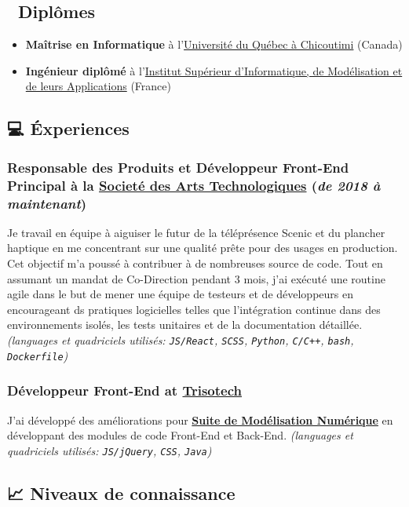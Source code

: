 \documentclass[11pt]{article}
\begin{document}
\subsection{🏫 Diplômes}
\label{sec:org889bc8c}
\begin{itemize}
\item \textbf{Maîtrise en Informatique} à l'\href{https://www.uqac.ca/}{Université du Québec à Chicoutimi} (Canada)
\item \textbf{Ingénieur diplômé} à l'\href{https://www.clermont-auvergne-inp.fr/ecoles/isima/}{Institut Supérieur d’Informatique, de Modélisation et de leurs Applications} (France)
\end{itemize}

\subsection{💻 Éxperiences}
\label{sec:org9f2dbfc}
\subsubsection{\textbf{Responsable des Produits} et \textbf{Développeur Front-End Principal} à la \href{https://sat.qc.ca/}{Societé des Arts Technologiques} (\emph{de 2018 à maintenant})}
\label{sec:org9fb429a}
Je travail en équipe à aiguiser le futur de la téléprésence Scenic et du plancher haptique en me concentrant sur une qualité prête pour des usages en production. Cet objectif m'a poussé à contribuer à de nombreuses source de code. Tout en assumant un mandat de Co-Direction pendant 3 mois, j'ai exécuté une routine agile dans le but de mener une équipe de testeurs et de développeurs en encourageant ds pratiques logicielles telles que l'intégration continue dans des environnements isolés, les tests unitaires et de la documentation détaillée.
\emph{(languages et quadriciels utilisés: \texttt{JS/React}, \texttt{SCSS}, \texttt{Python}, \texttt{C/C++}, \texttt{bash}, \texttt{Dockerfile})}
\subsubsection{\textbf{Développeur Front-End} at \href{https://www.trisotech.com/}{Trisotech}}
\label{sec:org2ac8e54}
J'ai développé des améliorations pour \href{https://www.trisotech.com/digital-modeling-suite/}{\textbf{Suite de Modélisation Numérique}} en développant des modules de code Front-End et Back-End.
\emph{(languages et quadriciels utilisés: \texttt{JS/jQuery}, \texttt{CSS}, \texttt{Java})}
\subsection{📈 Niveaux de connaissance}
\label{sec:org9bde4ce}
\end{document}
